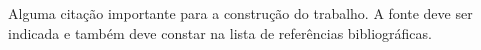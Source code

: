 \begin{epigrafe}
    \vspace*{\fill}
    
	\begin{flushright}
   Alguma citação importante para a construção do trabalho. A fonte deve ser indicada e também deve constar na lista de referências bibliográficas.
	\end{flushright}
    
\end{epigrafe}